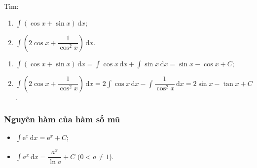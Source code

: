 \documentclass[12pt,aspectratio=169]{beamer}
\begin{document}
\begin{vd}
	Tìm:
	\begin{enumerate}
		\item $\displaystyle\int (\cos x + \sin x)\mathrm{\,d}x$;
		\item $\displaystyle\int\left(2\cos x + \dfrac{1}{\cos^2 x}\right)\mathrm{\,d}x$.
	\end{enumerate}

	\begin{loigiai}
		\begin{enumerate}
			\item $\displaystyle\int (\cos x + \sin x)\mathrm{\,d}x = \displaystyle\int \cos x\mathrm{\,d}x + \displaystyle\int \sin x\mathrm{\,d}x = \sin x - \cos x + C$;
			\item $\displaystyle\int (2\cos x + \dfrac{1}{\cos^2 x})\mathrm{\,d}x = 2\displaystyle\int \cos x\mathrm{\,d}x - \displaystyle\int \dfrac{1}{\cos^2 x}\mathrm{\,d}x = 2\sin x - \tan x + C$.
		\end{enumerate}
	\end{loigiai}
\end{vd}

\subsubsection{Nguyên hàm của hàm số mũ}

\begin{tomtat}
	\begin{dl}
		\begin{itemize}
			\item $\displaystyle\int \mathrm{e}^x\mathrm{\,d}x = \mathrm{e}^x + C$;
			\item $\displaystyle\int a^x\mathrm{\,d}x = \dfrac{a^x}{\ln a} + C$ ($0<a\neq1$).
		\end{itemize}
	\end{dl}
\end{tomtat}
\end{document}

